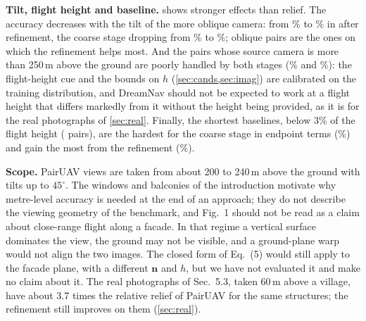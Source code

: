 \noindent\textbf{Tilt, flight height and baseline.}  shows stronger effects than relief. The accuracy decreases with the tilt of the more oblique camera: from \plTiltLoSiiSRd\% to \plTiltHiSiiSRd\% in \SRd{} after refinement, the coarse stage dropping from \plTiltLoSiSRd\% to \plTiltHiSiSRd\%; oblique pairs are the ones on which the refinement helps most. And the \plHighN{} pairs whose source camera is more than 250\,m above the ground are poorly handled by both stages (\plHighSiSRd\% and \plHighSiiSRd\%): the flight-height cue and the bounds on $h$ (\cref{sec:cands,sec:imag}) are calibrated on the training distribution, and DreamNav should not be expected to work at a flight height that differs markedly from it without the height being provided, as it is for the real photographs of \cref{sec:real}. Finally, the shortest baselines, below 3\% of the flight height (\plShortN{} pairs), are the hardest for the coarse stage in endpoint terms (\plShortSiSRe\%) and gain the most from the refinement (\plShortSiiSRe\%).

\noindent\textbf{Scope.} PairUAV views are taken from about 200 to 240\,m above the ground with tilts up to $45^\circ$. The windows and balconies of the introduction motivate why metre-level accuracy is needed at the end of an approach; they do not describe the viewing geometry of the benchmark, and Fig.~1 should not be read as a claim about close-range flight along a facade. In that regime a vertical surface dominates the view, the ground may not be visible, and a ground-plane warp would not align the two images. The closed form of Eq.~(5) would still apply to the facade plane, with a different $\mathbf{n}$ and $h$, but we have not evaluated it and make no claim about it. The real photographs of Sec.~5.3, taken 60\,m above a village, have about 3.7 times the relative relief of PairUAV for the same structures; the refinement still improves on them (\cref{sec:real}).
